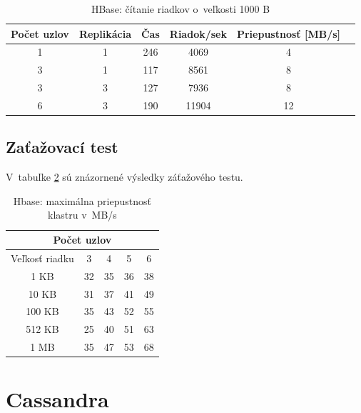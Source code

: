 \documentclass[11pt,twoside,a4paper]{book}
\begin{document}
\begin{table}[hp]
\begin{center}
\begin{tabular}{|c|c|c|c|c|c|}

\hline Počet uzlov & Replikácia & Čas & Riadok/sek & Priepustnosť [MB/s]\\ 
\hline
\hline 1 & 1 & 246 & 4069 & 4\\ 
\hline 3 & 1 & 117 & 8561 & 8\\ 
\hline 3 & 3 & 127 & 7936 & 8\\ 
\hline 6 & 3 & 190 & 11904 & 12\\ 
\hline
\end{tabular} 
\end{center}
\caption{HBase: čítanie riadkov o~veľkosti 1000 B}
\label{tab:HPerf2}
\end{table}

\subsection*{Zaťažovací test}

V~tabuľke \ref{tab:HPerf3} sú znázornené výsledky záťažového testu.

\begin{table}[htp]
\begin{center}
\begin{tabular}{|c|c|c|c|c|}
\hline
\multicolumn{5}{|c|}{Počet uzlov}  \\
\hline Veľkosť riadku & 3 & 4 & 5 & 6\\ 
\hline
\hline 1 KB & 32 & 35 & 36 & 38\\ 
\hline 10 KB & 31 & 37 & 41 & 49 \\ 
\hline 100 KB & 35 & 43 & 52 & 55\\ 
\hline 512 KB & 25 & 40 & 51 & 63 \\  
\hline 1 MB & 35 & 47 & 53 & 68 \\ 
\hline
\end{tabular} 
\end{center}
\caption{Hbase: maximálna priepustnosť klastru v~MB/s}
\label{tab:HPerf3}
\end{table}



\section{Cassandra}
\end{document}
